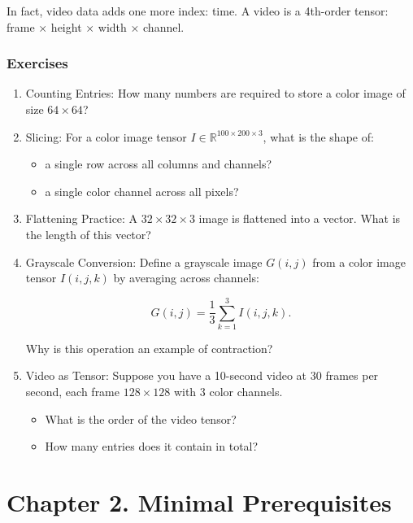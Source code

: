 \documentclass[
  letterpaper,
  DIV=11,
  numbers=noendperiod]{scrreprt}
\providecommand{\tightlist}{%
  \setlength{\itemsep}{0pt}\setlength{\parskip}{0pt}}
\begin{document}
In fact, video data adds one more index: time. A video is a 4th-order
tensor: frame × height × width × channel.

\subsubsection{Exercises}\label{exercises-3}

\begin{enumerate}
\def\labelenumi{\arabic{enumi}.}
\item
  Counting Entries: How many numbers are required to store a color image
  of size \(64 \times 64\)?
\item
  Slicing: For a color image tensor
  \(I \in \mathbb{R}^{100 \times 200 \times 3}\), what is the shape of:

  \begin{itemize}
  \tightlist
  \item
    a single row across all columns and channels?
  \item
    a single color channel across all pixels?
  \end{itemize}
\item
  Flattening Practice: A \(32 \times 32 \times 3\) image is flattened
  into a vector. What is the length of this vector?
\item
  Grayscale Conversion: Define a grayscale image \(G(i,j)\) from a color
  image tensor \(I(i,j,k)\) by averaging across channels:

  \[
  G(i,j) = \frac{1}{3} \sum_{k=1}^3 I(i,j,k).
  \]

  Why is this operation an example of contraction?
\item
  Video as Tensor: Suppose you have a 10-second video at 30 frames per
  second, each frame \(128 \times 128\) with 3 color channels.

  \begin{itemize}
  \tightlist
  \item
    What is the order of the video tensor?
  \item
    How many entries does it contain in total?
  \end{itemize}
\end{enumerate}

\section{Chapter 2. Minimal
Prerequisites}\label{chapter-2.-minimal-prerequisites}
\end{document}
